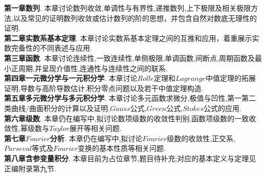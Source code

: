 \documentclass[a4paper,12pt,fleqn,openany,twoside,fontset=windows]{ctexbook}
\begin{document}
\pagestyle{plainnowm}
\begin{booknotelongbody}
\textbf{第一章\quad 数列}. 本章讨论数列收敛,单调性与有界性,递推数列,上下极限及相关极限方法,以及常见的证明数列收敛或估计数列的阶的思想，并包含自然对数底无理性的证明. \\

\textbf{第二章\quad 实数系基本定理}. 本章讨论实数系基本定理之间的互推和应用，着重展示实数完备性的不同表述与应用.\\

\textbf{第三章\quad 函数}. 本章讨论连续性,一致连续性,单侧极限,单调函数,间断点,周期函数及最小正周期,并呈现介值性,连通性与连续性之间的联系.\\

\textbf{第四章\quad 一元微分学与一元积分学}. 本章讨论$Rolle$定理和$Lagrange$中值定理的拓展证明,导数与高阶导数估计,积分零点问题以及若干中值定理构造.\\

\textbf{第五章\quad 多元微分学与多元积分学}. 本章讨论多元函数求微分,极值与凹性,第一第二类曲线/曲面积分的计算以及证明,$Gauss$公式,$Green$公式,$Stokes$公式的应用.\\

\textbf{第六章\quad 级数}. 本章仍在编写中,拟讨论数项级数的收敛性判别,函数项级数的一致收敛性,幂级数与$Taylor$展开等相关问题.\\

\textbf{第七章\quad $Fourier$分析}. 本章仍在编写中,拟讨论$Fourier$级数的收敛性,正交系,$Parseval$等式及$Fourier$变换的基本性质等相关问题.\\

\textbf{第八章\quad 含参变量积分}. 本章目前为占位章节,题目待补充;对应的基本定义与定理见正编附录第九节.\\
\end{booknotelongbody}
\pagestyle{main}
\clearpage
\end{document}
